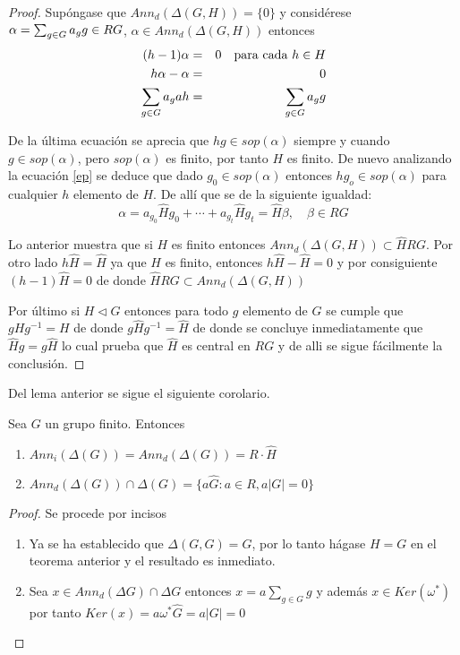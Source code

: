\begin{proof}
Supóngase que $Ann_d(\Delta(G,H)) = \{ 0\}$ y considérese $\alpha = \sum_{g \in G} a_{g} g \in RG$, $\alpha \in Ann_d(\Delta(G,H))$ entonces
\begin{eqnarray}
(h-1)\alpha &=& 0  \quad \mbox{para cada } h \in H  \\
h\alpha -\alpha &=&  0  \\
\sum_{g \in G} a_gah &=& \sum_{g \in G} a_{g} g \label{ep}
\end{eqnarray}

De la última ecuación se aprecia que $hg \in sop(\alpha)$ siempre y cuando $g \in sop(\alpha)$, pero $sop(\alpha)$ es finito, por tanto $H$ es finito.
De nuevo analizando la ecuación \ref{ep} se deduce que dado $g_0 \in sop(\alpha)$ entonces $hg_o \in sop(\alpha)$ para cualquier $h$ elemento de $H$. De allí que se de la siguiente igualdad:
\[ \alpha = a_{g_0}\hat{H}g_0 + \cdots + a_{g_t}\hat{H}g_t = \hat{H}\beta, \quad \beta \in RG \]

Lo anterior muestra que si $H$ es finito entonces $Ann_d(\Delta(G,H))\subset \hat{H}RG$. Por otro lado $h\hat{H} = \hat{H}$ ya que $H$ es finito, entonces $h\hat{H} -\hat{H} = 0$ y por consiguiente $(h-1)\hat{H} = 0$ de donde $\hat{H}RG \subset Ann_d(\Delta(G,H))  $

Por último si $H \lhd G$ entonces para todo $g$ elemento de $G$ se cumple que $gHg^{-1} = H$ de donde $g\hat{H}g^{-1} = \hat{H}$ de donde se concluye inmediatamente que $\hat{H}g = g\hat{H}$ lo cual prueba que $\hat{H}$ es central en $RG$ y de alli se sigue fácilmente la conclusión. \qedhere
\end{proof}

Del lema anterior se sigue el siguiente corolario.

\begin{corolario}
Sea $G$ un grupo finito. Entonces 

\begin{enumerate}
\item $Ann_i (\Delta(G)) = Ann_d(\Delta(G)) = R\cdot \hat{H}$
\item $Ann_d(\Delta(G)) \cap \Delta (G) = \{ a\hat{G} : a \in R , a|G| = 0\}$ 
\end{enumerate}
\end{corolario}


\begin{proof}
Se procede por incisos
\begin{enumerate}
\item Ya se ha establecido que $\Delta(G,G) = G$, por lo tanto hágase $H=G$ en el teorema anterior y el resultado es inmediato.
\item Sea $x \in Ann_d(\Delta G) \cap \Delta G$ entonces $x = a\sum_{g\in G}g$ y además $x \in Ker(\omega^*)$ por tanto $Ker(x)= a\omega^*\hat{G} = a|G| = 0 $ \qedhere
\end{enumerate}
\end{proof}


